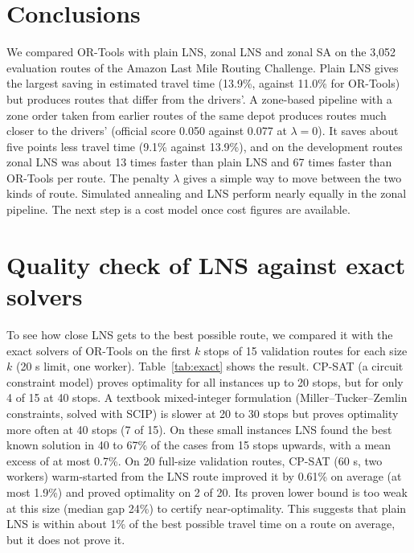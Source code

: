 \documentclass[11pt,a4paper]{article}
\begin{document}
\section{Conclusions}\label{sec:conclusion}
We compared OR-Tools with plain LNS, zonal LNS and zonal SA on the 3,052 evaluation routes of the Amazon Last Mile Routing Challenge. Plain LNS gives the largest saving in estimated travel time (13.9\%, against 11.0\% for OR-Tools) but produces routes that differ from the drivers'. A zone-based pipeline with a zone order taken from earlier routes of the same depot produces routes much closer to the drivers' (official score 0.050 against 0.077 at $\lambda=0$). It saves about five points less travel time (9.1\% against 13.9\%), and on the development routes zonal LNS was about 13 times faster than plain LNS and 67 times faster than OR-Tools per route. The penalty $\lambda$ gives a simple way to move between the two kinds of route. Simulated annealing and LNS perform nearly equally in the zonal pipeline. The next step is a cost model once cost figures are available.

\appendix
\section{Quality check of LNS against exact solvers}\label{app:exact}
To see how close LNS gets to the best possible route, we compared it with the exact solvers of OR-Tools on the first $k$ stops of 15 validation routes for each size $k$ (20 s limit, one worker). Table~\ref{tab:exact} shows the result. CP-SAT (a circuit constraint model) proves optimality for all instances up to 20 stops, but for only 4 of 15 at 40 stops. A textbook mixed-integer formulation (Miller--Tucker--Zemlin constraints, solved with SCIP) is slower at 20 to 30 stops but proves optimality more often at 40 stops (7 of 15). On these small instances LNS found the best known solution in 40 to 67\% of the cases from 15 stops upwards, with a mean excess of at most 0.7\%. On 20 full-size validation routes, CP-SAT (60 s, two workers) warm-started from the LNS route improved it by 0.61\% on average (at most 1.9\%) and proved optimality on 2 of 20. Its proven lower bound is too weak at this size (median gap 24\%) to certify near-optimality. This suggests that plain LNS is within about 1\% of the best possible travel time on a route on average, but it does not prove it.
\end{document}
